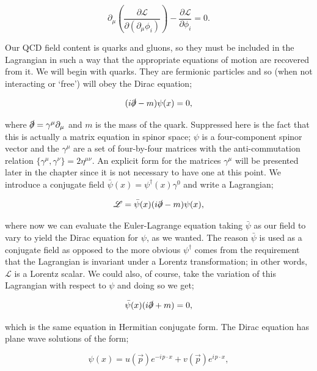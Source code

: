 \begin{equation}
\label{eqn:el}
\partial_\mu \left( \frac{\partial \mathscr{L}}{\partial (\partial_\mu \phi_i)} \right) - \frac{\partial \mathscr{L}}{\partial \phi_i} = 0.
\end{equation}

Our QCD field content is quarks and gluons, so they must be included in the Lagrangian in such a way that the appropriate equations of motion are recovered from it. We will begin with quarks. They are fermionic particles and so (when not interacting or `free') will obey the Dirac equation;

\begin{equation}
(i \slashed{\partial} - m) \psi(x) = 0,
\end{equation}

where $\slashed{\partial} = \gamma^\mu \partial_\mu$ and $m$ is the mass of the quark. Suppressed here is the fact that this is actually a matrix equation in spinor space; $\psi$ is a four-component spinor vector and the $\gamma^\mu$ are a set of four-by-four matrices with the anti-commutation relation $\{\gamma^\mu, \gamma^\nu\} = 2 \eta^{\mu \nu}$. An explicit form for the matrices $\gamma^\mu$ will be presented later in the chapter since it is not necessary to have one at this point. We introduce a conjugate field $\bar{\psi}(x) = \psi^\dagger(x) \gamma^0$ and write a Lagrangian;

\begin{equation}
\mathscr{L} = \bar{\psi}(x)(i \slashed{\partial} - m) \psi(x),
\end{equation}

where now we can evaluate the Euler-Lagrange equation taking $\bar{\psi}$ as our field to vary to yield the Dirac equation for $\psi$, as we wanted. The reason $\bar{\psi}$ is used as a conjugate field as opposed to the more obvious $\psi^\dagger$ comes from the requirement that the Lagrangian is invariant under a Lorentz transformation; in other words, $\mathscr{L}$ is a Lorentz scalar. We could also, of course, take the variation of this Lagrangian with respect to $\psi$ and doing so we get;

\begin{equation}
\bar{\psi}(x)(i \slashed{\partial} + m) = 0,
\end{equation}

which is the same equation in Hermitian conjugate form. The Dirac equation has plane wave solutions of the form;

\begin{equation}
\label{eqn:dirac}
\psi(x) = u\left(\vec{p}\right )e^{- i \hspace{1pt}p \cdot x} + v\left(\vec{p}\right ) e^{i \hspace{1pt} p \cdot x},
\end{equation}

